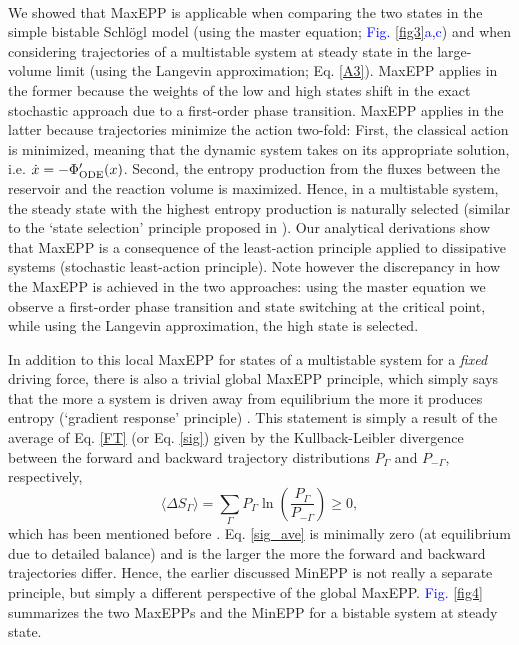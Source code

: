 \documentclass[aps,prl,reprint,singlecolumn,superscriptaddress]{revtex4}
\begin{document}
{\\
We showed that MaxEPP is applicable when comparing the two states in the simple bistable Schl\"ogl model (using the master equation;
\textcolor{blue}{Fig. \ref{fig3}a,c}) 
and when considering trajectories of a multistable system at steady state in the large-volume limit (using the Langevin approximation;
Eq. \ref{A3}). 
MaxEPP applies in the former because the weights of the low and high states shift in the exact stochastic approach 
due to a first-order phase transition. MaxEPP applies in the latter because trajectories minimize the action two-fold: 
First, the classical action is minimized, meaning that the dynamic system takes on its appropriate solution, i.e. $\dot x=-\Phi'_{\rm ODE}(x)$.
Second, the entropy production from the fluxes between the reservoir and the reaction volume is maximized. Hence, in a multistable system, the steady state with 
the highest entropy production is naturally selected {(similar to the `state selection' principle proposed
in \cite{meysman10})}. Our analytical derivations show that MaxEPP is a consequence of the least-action principle 
applied to dissipative systems (stochastic least-action principle). Note however the discrepancy in how the MaxEPP is achieved in the 
two approaches: using the master equation we observe a first-order phase transition and state switching at the critical point, while using the
Langevin approximation, the high state is selected.

In addition to this local MaxEPP for states of a multistable system for a {\it fixed} driving force, there is also 
a trivial global MaxEPP principle, which simply says that the more a system is driven away from equilibrium the 
more it produces entropy {(`gradient response' principle) \cite{schneider94,meysman10}.} This statement is simply a result 
of the average of Eq. \ref{FT} (or Eq. \ref{sig}) given by the Kullback-Leibler divergence between the forward and backward trajectory 
distributions $P_\Gamma$ and $P_{-\Gamma}$, respectively, 
\begin{equation}
\langle \Delta S_\Gamma\rangle=\sum_\Gamma P_\Gamma\ln\left(\frac{P_\Gamma}{P_{-\Gamma}}\right)\geq 0,\label{sig_ave}
\end{equation}
which has been mentioned before \cite{searles08}. Eq. \ref{sig_ave} is minimally zero (at equilibrium due to detailed balance) 
and is the larger the more the forward and backward trajectories differ. Hence, the earlier discussed MinEPP is not really a separate
principle, but simply a different perspective of the global MaxEPP. \textcolor{blue}{Fig. \ref{fig4}} summarizes the two MaxEPPs 
and the MinEPP for a bistable system at steady state. 

}
\end{document}
